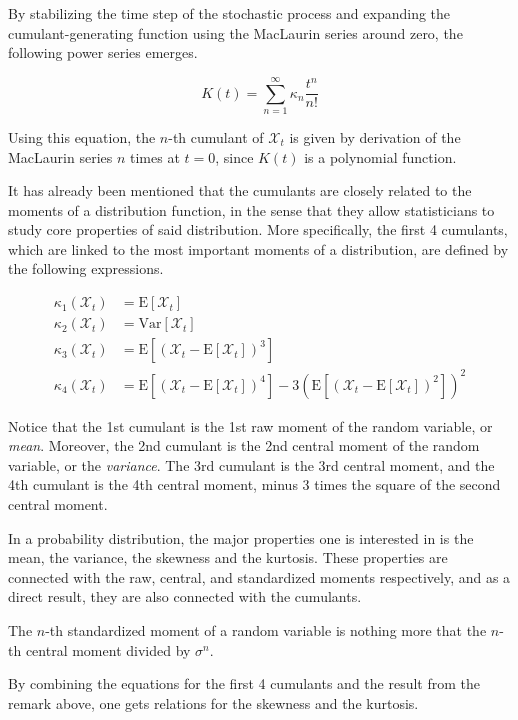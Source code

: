 By stabilizing the time step of the stochastic process and expanding the cumulant-generating function using the MacLaurin series around zero, the following power series emerges.

\[
K(t) = \sum_{n=1}^{\infty} \kappa_{n} \frac{t^n}{n!}
\]

Using this equation, the $n$-th cumulant of $\mathcal{X}_t$ is given by derivation of the MacLaurin series $n$ times at $t=0$, since \( K(t) \) is a polynomial function. 

It has already been mentioned that the cumulants are closely related to the moments of a distribution function, in the sense that they allow statisticians to study core properties of said distribution. More specifically, the first 4 cumulants, which are linked to the most important moments of a distribution, are defined by the following expressions.


\begin{align*}
	\kappa_{1} (\mathcal{X}_t) &= \text{E}[\mathcal{X}_t]	\\
	\kappa_{2} (\mathcal{X}_t) &= \text{Var}[\mathcal{X}_t] \\
	\kappa_{3} (\mathcal{X}_t) &= \text{E}[(\mathcal{X}_t - \text{E}[\mathcal{X}_t])^3]\\
	\kappa_{4} (\mathcal{X}_t) &= \text{E}[(\mathcal{X}_t - \text{E}[\mathcal{X}_t])^4]- 3 ( \text{E}[(\mathcal{X}_t - \text{E}[\mathcal{X}_t])^2])^2
\end{align*}

Notice that the 1st cumulant is the 1st raw moment of the random variable, or \textit{mean}. Moreover, the 2nd cumulant is the 2nd central moment of the random variable, or the \textit{variance}. The 3rd cumulant is the 3rd central moment, and the 4th cumulant is the 4th central moment, minus 3 times the square of the second central moment.

In a probability distribution, the major properties one is interested in is the mean, the variance, the skewness and the kurtosis. These properties are connected with the raw, central, and standardized moments respectively, and as a direct result, they are also connected with the cumulants.

\begin{remark}
	The $n$-th standardized moment of a random variable is nothing more that the $n$-th central moment divided by $\sigma^n$.
\end{remark}

By combining the equations for the first 4 cumulants and the result from the remark above, one gets relations for the skewness and the kurtosis.


